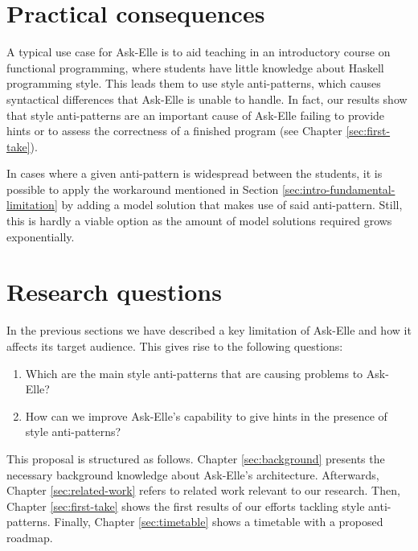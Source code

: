 \section{Practical consequences}

A typical use case for Ask-Elle is to aid teaching in an introductory course on functional programming, where students have little knowledge about Haskell programming style. This leads them to use style anti-patterns, which causes syntactical differences that Ask-Elle is unable to handle. In fact, our results show that style anti-patterns are an important cause of Ask-Elle failing to provide hints or to assess the correctness of a finished program (see Chapter \ref{sec:first-take}).

In cases where a given anti-pattern is widespread between the students, it is possible to apply the workaround mentioned in Section \ref{sec:intro-fundamental-limitation} by adding a model solution that makes use of said anti-pattern. Still, this is hardly a viable option as the amount of model solutions required grows exponentially.

\section{Research questions}

In the previous sections we have described a key limitation of Ask-Elle and how it affects its target audience. This gives rise to the following questions:

\begin{enumerate}
    \item Which are the main style anti-patterns that are causing problems to Ask-Elle?
    \item How can we improve Ask-Elle's capability to give hints in the presence of style anti-patterns?
\end{enumerate}

This proposal is structured as follows. Chapter \ref{sec:background} presents the necessary background knowledge about Ask-Elle's architecture. Afterwards, Chapter \ref{sec:related-work} refers to related work relevant to our research. Then, Chapter \ref{sec:first-take} shows the first results of our efforts tackling style anti-patterns. Finally, Chapter \ref{sec:timetable} shows a timetable with a proposed roadmap.

